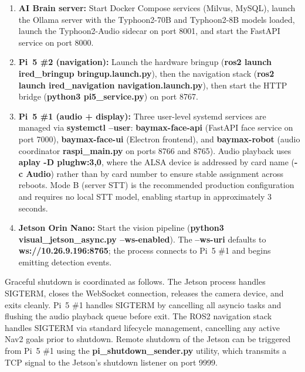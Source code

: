 \begin{enumerate}
    \item \textbf{AI Brain server:} Start Docker Compose services (Milvus, MySQL), launch the Ollama server with the Typhoon2-70B and Typhoon2-8B models loaded, launch the Typhoon2-Audio sidecar on port 8001, and start the FastAPI service on port 8000.

    \item \textbf{Pi~5 \#2 (navigation):} Launch the hardware bringup (\textbf{ros2 launch ired\_bringup bringup.launch.py}), then the navigation stack (\textbf{ros2 launch ired\_navigation navigation.launch.py}), then start the HTTP bridge (\textbf{python3 pi5\_service.py}) on port 8767.

    \item \textbf{Pi~5 \#1 (audio + display):} Three user-level systemd services are managed via \textbf{systemctl --user}: \textbf{baymax-face-api} (FastAPI face service on port 7000), \textbf{baymax-face-ui} (Electron frontend), and \textbf{baymax-robot} (audio coordinator \textbf{raspi\_main.py} on ports 8766 and 8765). Audio playback uses \textbf{aplay -D plughw:3,0}, where the ALSA device is addressed by card name (\textbf{-c Audio}) rather than by card number to ensure stable assignment across reboots. Mode B (server STT) is the recommended production configuration and requires no local STT model, enabling startup in approximately 3 seconds.

    \item \textbf{Jetson Orin Nano:} Start the vision pipeline (\textbf{python3 visual\_jetson\_async.py --ws-enabled}). The \textbf{--ws-uri} defaults to \textbf{ws://10.26.9.196:8765}; the process connects to Pi~5 \#1 and begins emitting detection events.
\end{enumerate}

Graceful shutdown is coordinated as follows. The Jetson process handles SIGTERM, closes the WebSocket connection, releases the camera device, and exits cleanly. Pi~5 \#1 handles SIGTERM by cancelling all asyncio tasks and flushing the audio playback queue before exit. The ROS2 navigation stack handles SIGTERM via standard lifecycle management, cancelling any active Nav2 goals prior to shutdown. Remote shutdown of the Jetson can be triggered from Pi~5 \#1 using the \textbf{pi\_shutdown\_sender.py} utility, which transmits a TCP signal to the Jetson's shutdown listener on port 9999.
